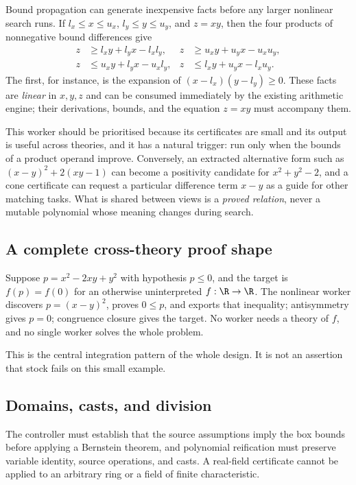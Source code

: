 Bound propagation can generate inexpensive facts before any larger nonlinear
search runs. If $l_x\le x\le u_x$, $l_y\le y\le u_y$, and $z=xy$, then the four
products of nonnegative bound differences give
\begin{align*}
 z&\ge l_xy+l_yx-l_xl_y, & z&\ge u_xy+u_yx-u_xu_y,\\
 z&\le u_xy+l_yx-u_xl_y, & z&\le l_xy+u_yx-l_xu_y.
\end{align*}
The first, for instance, is the expansion of $(x-l_x)(y-l_y)\ge0$. These facts
are \emph{linear} in $x,y,z$ and can be consumed immediately by the existing
arithmetic engine; their derivations, bounds, and the equation $z=xy$ must
accompany them.

This worker should be prioritised because its certificates are small and its
output is useful across theories, and it has a natural trigger: run only when
the bounds of a product operand improve. Conversely, an extracted alternative
form such as $(x-y)^2+2(xy-1)$ can become a positivity candidate for
$x^2+y^2-2$, and a cone certificate can request a particular difference term
$x-y$ as a guide for other matching tasks. What is shared between views is a
\emph{proved relation}, never a mutable polynomial whose meaning changes during
search.

\subsection{A complete cross-theory proof shape}

Suppose $p=x^2-2xy+y^2$ with hypothesis $p\le0$, and the target is $f(p)=f(0)$
for an otherwise uninterpreted $f:\R\to\R$. The nonlinear worker discovers
$p=(x-y)^2$, proves $0\le p$, and exports that inequality; antisymmetry gives
$p=0$; congruence closure gives the target. No worker needs a theory of $f$, and
no single worker solves the whole problem.

This is the central integration pattern of the whole design. It is not an
assertion that stock \grind{} fails on this small example.

\subsection{Domains, casts, and division}

The controller must establish that the source assumptions imply the box bounds
before applying a Bernstein theorem, and polynomial reification must preserve
variable identity, source operations, and casts. A real-field certificate cannot
be applied to an arbitrary ring or a field of finite characteristic.

